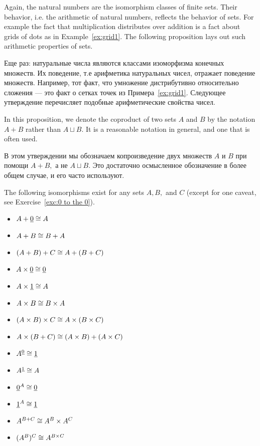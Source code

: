 \documentclass[../main/CT4S-EN-RU]{subfiles}
\begin{document}
\begin{blockENG}
Again, the natural numbers are the isomorphism classes of finite sets. Their behavior, i.e. the arithmetic of natural numbers, reflects the behavior of sets. For example the fact that multiplication distributes over addition is a fact about grids of dots as in Example~\ref{ex:grid1}. The following proposition lays out such arithmetic properties of sets.
\end{blockENG}

\begin{blockRUS}
Еще раз: натуральные числа являются классами изоморфизма конечных множеств. Их поведение, т.е арифметика натуральных чисел, отражает поведение множеств. Например, тот факт, что умножение дистрибутивно относительно сложения — это факт о сетках точек из Примера~\ref{ex:grid1}. Следующее утверждение перечисляет подобные арифметические свойства чисел.
\end{blockRUS}

\begin{blockENG}
In this proposition, we denote the coproduct of two sets $A$ and $B$ by the notation $A+B$ rather than $A\sqcup B.$ It is a reasonable notation in general, and one that is often used. 
\end{blockENG}

\begin{blockRUS}
В этом утверждении мы обозначаем копроизведение двух множеств $A$ и $B$ при помощи $A+B,$ а не $A\sqcup B.$ Это достаточно осмысленное обозначение в более общем случае, и его часто используют. 
\end{blockRUS}

\begin{propositionENG}\label{prop:arithmetic of sets}
The following isomorphisms exist for any sets $A,B,$ and $C$ (except for one caveat, see Exercise~\ref{exc:0 to the 0}). 
 
\begin{itemize}
\item $A+\underline{0}\cong A$
\item $A + B\cong B + A$
\item $(A + B) + C \cong A + (B + C)$
\item $A\times\underline{0}\cong\underline{0}$
\item $A\times\underline{1}\cong A$
\item $A\times B\cong B\times A$
\item $(A\times B)\times C \cong A\times (B\times C)$
\item $A\times(B+C)\cong (A\times B)+(A\times C)$
\item $A^{\underline{0}}\cong \underline{1}$
\item $A^{\underline{1}}\cong A$
\item $\underline{0}^A\cong\underline{0}$
\item $\underline{1}^A\cong\underline{1}$
\item $A^{B+C}\cong A^B\times A^C$
\item $(A^B)^C\cong A^{B\times C}$
\end{itemize}
\end{propositionENG}
\end{document}

